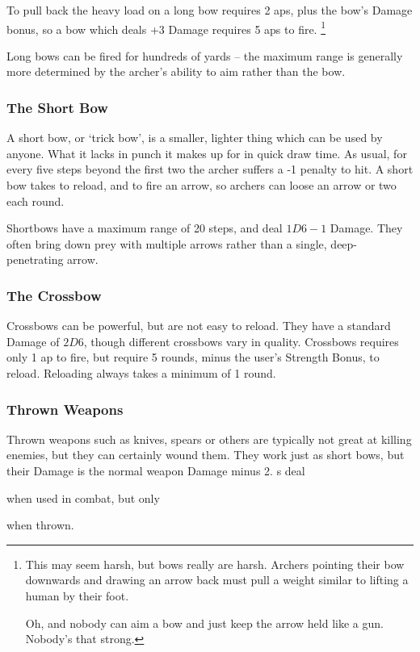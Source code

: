 \begin{multicols}{2}
To pull back the heavy load on a long bow requires 2 \glspl{ap}, plus the bow's Damage bonus, so a bow which deals +3 Damage requires 5 \glspl{ap} to fire.%
\footnote{
  This may seem harsh, but bows really are harsh.  Archers pointing their bow downwards and drawing an arrow back must pull a weight similar to lifting a human by their foot.

  Oh, and nobody can aim a bow and just keep the arrow held like a gun.
  Nobody's that strong.
}

Long bows can be fired for hundreds of yards -- the maximum range is generally more determined by the archer's ability to aim rather than the bow.

\subsubsection{The Short Bow}

A short bow, or `trick bow', is a smaller, lighter thing which can be used by anyone.
What it lacks in punch it makes up for in quick draw time.
As usual, for every five steps beyond the first two the archer suffers a -1 penalty to hit.
A short bow takes  to reload, and  to fire an arrow, so archers can loose an arrow or two each round.

Shortbows have a maximum range of 20 steps, and deal $1D6-1$ Damage.
They often bring down prey with multiple arrows rather than a single, deep-penetrating arrow.

\subsubsection{The Crossbow}
\label{crossbow}
Crossbows can be powerful, but are not easy to reload.
They have a standard Damage of $2D6$, though different crossbows vary in quality.
Crossbows requires only 1 \gls{ap} to fire, but require 5 rounds, minus the user's Strength Bonus, to reload.
Reloading always takes a minimum of 1 round.

\subsubsection{Thrown Weapons}

Thrown weapons such as knives, spears or others are typically not great at killing enemies, but they can certainly wound them.
They work just as short bows, but their Damage is the normal weapon Damage minus 2.
\javelin s deal
\addtocounter{damage}{4}
when used in combat, but only
\addtocounter{damage}{-2}%
 when thrown.


\end{multicols}
